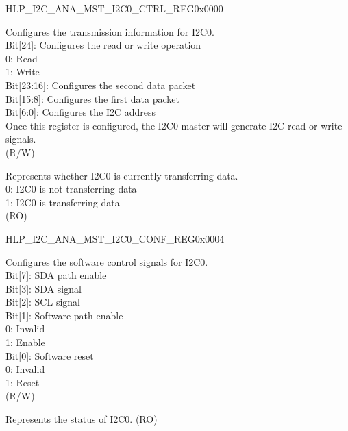 \begin{register}{H}{LP\_I2C\_ANA\_MST\_I2C0\_CTRL\_REG}{0x0000}\label{regdesc:LPI2CANAMSTI2C0CTRLREG}
%
%
%
\regnewline%
\begin{regdesc}\begin{reglist}
\label{fielddesc:LPI2CANAMSTI2C0CTRL}\item [LP\_I2C\_ANA\_MST\_I2C0\_CTRL] Configures the transmission information for I2C0. \\
Bit[24]: Configures the read or write operation\\
0: Read \\
1: Write \\
Bit[23:16]: Configures the second data packet\\
Bit[15:8]: Configures the first data packet\\
Bit[6:0]: Configures the I2C address\\
Once this register is configured, the I2C0 master will generate I2C read or write signals.\\
(R/W)
\label{fielddesc:LPI2CANAMSTI2C0BUSY}\item [LP\_I2C\_ANA\_MST\_I2C0\_BUSY] Represents whether I2C0 is currently transferring data. \\
0: I2C0 is not transferring data\\
1: I2C0 is transferring data \\
(RO)
\end{reglist}\end{regdesc}
\end{register}


\begin{register}{H}{LP\_I2C\_ANA\_MST\_I2C0\_CONF\_REG}{0x0004}\label{regdesc:LPI2CANAMSTI2C0CONFREG}
%
%
\regnewline%
\begin{regdesc}\begin{reglist}
\label{fielddesc:LPI2CANAMSTI2C0CONF}\item [LP\_I2C\_ANA\_MST\_I2C0\_CONF] Configures the software control signals for I2C0. \\
Bit[7]: SDA path enable\\
Bit[3]: SDA signal\\
Bit[2]: SCL signal\\
Bit[1]: Software path enable\\
0: Invalid\\
1: Enable\\
Bit[0]: Software reset\\
0: Invalid\\
1: Reset\\
(R/W)
\label{fielddesc:LPI2CANAMSTI2C0STATUS}\item [LP\_I2C\_ANA\_MST\_I2C0\_STATUS] Represents the status of I2C0. (RO)
\end{reglist}\end{regdesc}
\end{register}



